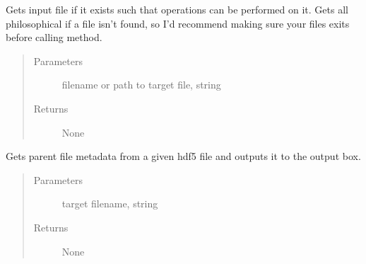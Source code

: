 \documentclass[letterpaper,10pt,english]{sphinxmanual}
\begin{document}
\begin{fulllineitems}
\begin{fulllineitems}
\begin{quote}
\begin{description}
\end{description}\end{quote}

\end{fulllineitems}


\begin{fulllineitems}
\label{\detokenize{index:HDF5Browser.FileBrowser.__getFile}}
\sphinxAtStartPar
Gets input file if it exists such that operations can be performed on it. Gets all philosophical if a file
isn’t found, so I’d recommend making sure your files exits before calling method.
\begin{quote}\begin{description}
\item[{Parameters}] \leavevmode
\sphinxAtStartPar
{} \textendash{} filename or path to target file, string

\item[{Returns}] \leavevmode
\sphinxAtStartPar
None

\end{description}\end{quote}

\end{fulllineitems}


\begin{fulllineitems}
\label{\detokenize{index:HDF5Browser.FileBrowser.__getMetadata}}
\sphinxAtStartPar
Gets parent file metadata from a given hdf5 file and outputs it to the output box.
\begin{quote}\begin{description}
\item[{Parameters}] \leavevmode
\sphinxAtStartPar
{} \textendash{} target filename, string

\item[{Returns}] \leavevmode
\sphinxAtStartPar
None

\end{description}\end{quote}


\end{fulllineitems}
\end{fulllineitems}
\end{document}
